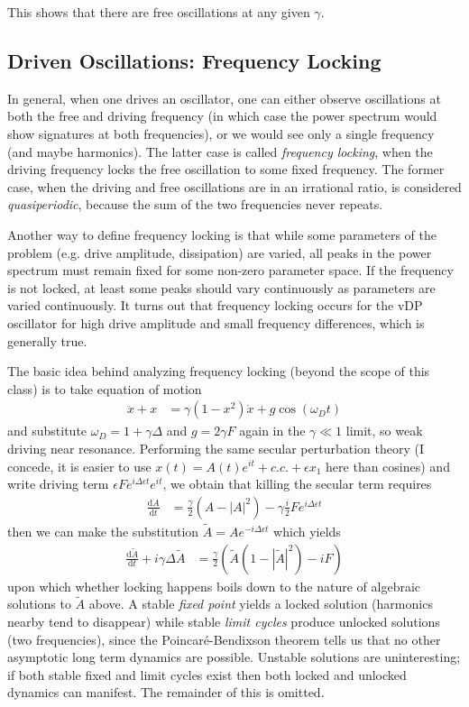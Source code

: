 \documentclass[10pt]{article}
\newcommand{\rd}[2]{\frac{\mathrm{d}#1}{\mathrm{d}#2}}
\newcommand{\abs}[1]{\left|#1\right|}
\begin{document}
This shows that there are free oscillations at any given $\gamma$.

\subsection{Driven Oscillations: Frequency Locking}

In general, when one drives an oscillator, one can either observe oscillations at both the free and driving frequency (in which case the power spectrum would show signatures at both frequencies), or we would see only a single frequency (and maybe harmonics). The latter case is called \emph{frequency locking}, when the driving frequency locks the free oscillation to some fixed frequency. The former case, when the driving and free oscillations are in an irrational ratio, is considered \emph{quasiperiodic}, because the sum of the two frequencies never repeats.

Another way to define frequency locking is that while some parameters of the problem (e.g. drive amplitude, dissipation) are varied, all peaks in the power spectrum must remain fixed for some non-zero parameter space. If the frequency is not locked, at least some peaks should vary continuously as parameters are varied continuously. It turns out that frequency locking occurs for the vDP oscillator for high drive amplitude and small frequency differences, which is generally true.

The basic idea behind analyzing frequency locking (beyond the scope of this class) is to take equation of motion
\begin{align}
    \ddot{x} + x &= \gamma(1-x^2)\dot{x} + g\cos(\omega_D t)
\end{align}
and substitute $\omega_D = 1 + \gamma \Delta$ and $g = 2\gamma F$ again in the $\gamma \ll 1$ limit, so weak driving near resonance. Performing the same secular perturbation theory (I concede, it is easier to use $x(t) = A(t)e^{it} + c.c. + \epsilon x_1$ here than cosines) and write driving term $\epsilon F e^{i \Delta \epsilon t}e^{it}$, we obtain that killing the secular term requires
\begin{align}
    \rd{A}{t} &= \frac{\gamma}{2}\left( A - \abs{A}^2 \right) - \gamma\frac{i}{2}Fe^{i\Delta \epsilon t}
\end{align}
then we can make the substitution $\tilde{A} = Ae^{-i\Delta \epsilon t}$ which yields
\begin{align}
    \rd{\tilde{A}}{t} + i\gamma \Delta \tilde{A} &= \frac{\gamma}{2}\left( \tilde{A}(1-\abs{\tilde{A}}^2) - iF \right)
\end{align}
upon which whether locking happens boils down to the nature of algebraic solutions to $\tilde{A}$ above. A stable \emph{fixed point} yields a locked solution (harmonics nearby tend to disappear) while stable \emph{limit cycles} produce unlocked solutions (two frequencies), since the Poincar\'e-Bendixson theorem tells us that no other asymptotic long term dynamics are possible. Unstable solutions are uninteresting; if both stable fixed and limit cycles exist then both locked and unlocked dynamics can manifest. The remainder of this is omitted.
\end{document}
